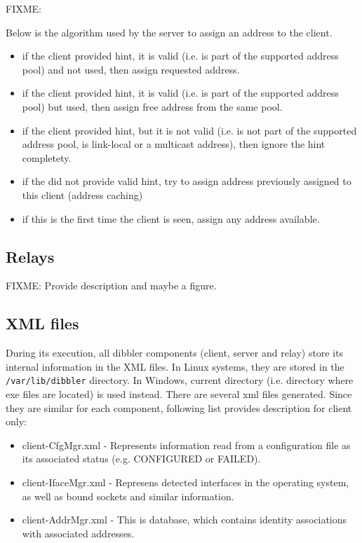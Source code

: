 FIXME:

Below is the algorithm used by the server to assign an address to the client.

\begin{itemize}
 \item if the client provided hint, it is valid (i.e. is part of the
       supported address pool) and not used, then assign requested address.
 \item if the client provided hint, it is valid (i.e. is part of the 
       supported address pool) but used, then assign free address from
       the same pool.
 \item if the client provided hint, but it is not valid (i.e. is not
       part of the supported address pool, is link-local or a multicast
       address), then ignore the hint completety.
 \item if the did not provide valid hint, try to assign address
       previously assigned to this client (address caching)
 \item if this is the first time the client is seen, assign any address
       available.
\end{itemize}

\subsection{Relays}
\label{features-relays}
FIXME: Provide description and maybe a figure.

\subsection{XML files}
During its execution, all dibbler components (client, server and
relay) store its internal information in the XML files. In Linux
systems, they are stored in the \verb+/var/lib/dibbler+ directory. In
Windows, current directory (i.e. directory where exe files are
located) is used instead. There are several xml files generated. Since
they are similar for each component, following list provides
description for client only:

\begin{itemize}
\item client-CfgMgr.xml - Represents information read from a
  configuration file as its associated status (e.g. CONFIGURED or
  FAILED).
\item client-IfaceMgr.xml - Represens detected interfaces in the
  operating system, as well as bound sockets and similar information.
\item client-AddrMgr.xml - This is database, which contains identity
  associations with associated addresses.
\end{itemize}
